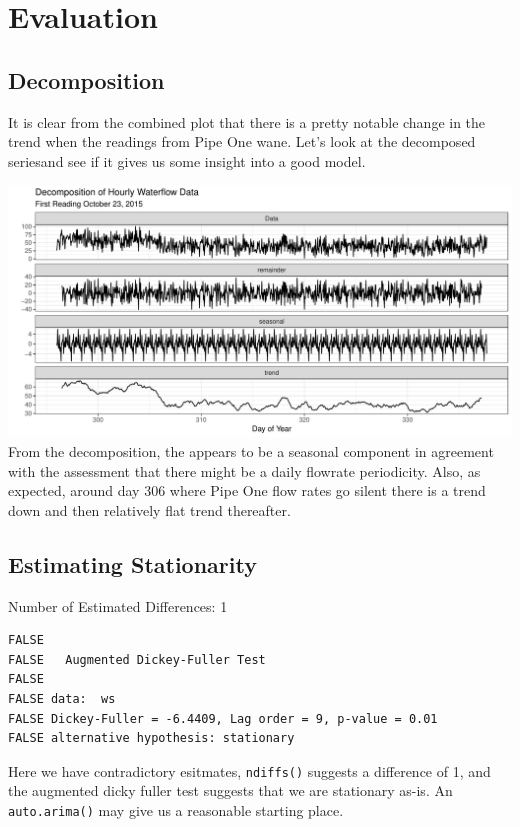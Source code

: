 \documentclass[openany]{book}
\begin{document}
\hypertarget{evaluation-2}{%
\section{Evaluation}\label{evaluation-2}}

\hypertarget{decomposition}{%
\subsection{Decomposition}\label{decomposition}}

It is clear from the combined plot that there is a pretty notable change
in the trend when the readings from Pipe One wane. Let's look at the
decomposed seriesand see if it gives us some insight into a good model.

\includegraphics{Group2_Project1_Fall2019_files/figure-latex/unnamed-chunk-18-1.pdf}
From the decomposition, the appears to be a seasonal component in
agreement with the assessment that there might be a daily flowrate
periodicity. Also, as expected, around day 306 where Pipe One flow rates
go silent there is a trend down and then relatively flat trend
thereafter.

\hypertarget{estimating-stationarity}{%
\subsection{Estimating Stationarity}\label{estimating-stationarity}}

Number of Estimated Differences: 1

\begin{verbatim}
FALSE 
FALSE   Augmented Dickey-Fuller Test
FALSE 
FALSE data:  ws
FALSE Dickey-Fuller = -6.4409, Lag order = 9, p-value = 0.01
FALSE alternative hypothesis: stationary
\end{verbatim}

Here we have contradictory esitmates, \texttt{ndiffs()} suggests a
difference of 1, and the augmented dicky fuller test suggests that we
are stationary as-is. An \texttt{auto.arima()} may give us a reasonable
starting place.
\end{document}
